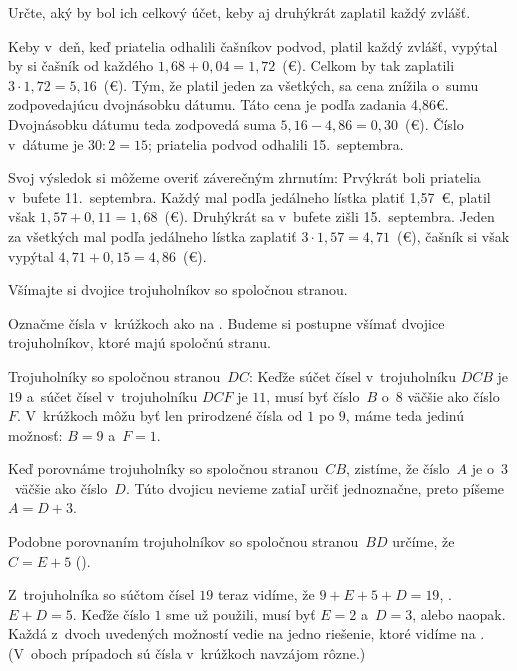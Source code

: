 {%
\napad
Určte, aký by bol ich celkový účet, keby aj druhýkrát zaplatil každý
zvlášť.

\riesenie
Keby v~deň, keď priatelia odhalili čašníkov podvod, platil každý zvlášť, vypýtal by si
čašník od každého $1{,}68+0{,}04=1{,}72$~(\euro).
Celkom by tak zaplatili $3\cdot 1{,}72=5{,}16$~(\euro).
Tým, že platil jeden za všetkých, sa cena znížila o~sumu zodpovedajúcu dvojnásobku dátumu.
Táto cena je podľa zadania 4{,}86€.
Dvojnásobku dátumu teda zodpovedá suma $5{,}16-4{,}86=0{,}30$~(\euro).
Číslo v~dátume je $30:2=15$;
priatelia podvod odhalili 15.~septembra.

\poznamka
Svoj výsledok si môžeme overiť záverečným zhrnutím:
Prvýkrát boli priatelia v~bufete 11.~septembra.
Každý mal podľa jedálneho lístka platiť 1{,}57~€, platil však $1{,}57+0{,}11=1{,}68$~(\euro).
Druhýkrát sa v~bufete zišli 15.~septembra.
Jeden za všetkých mal podľa jedálneho lístka zaplatiť $3\cdot 1{,}57=4{,}71$~(\euro),
čašník si však vypýtal $4{,}71+0{,}15=4{,}86$~(\euro).
}

{%
\napad
Všímajte si dvojice trojuholníkov so spoločnou stranou.


\riesenie
Označme čísla v~krúžkoch ako na \obr.
Budeme si postupne všímať dvojice trojuholníkov, ktoré majú spoločnú stranu.

Trojuholníky so spoločnou stranou~$DC$:
Keďže súčet čísel v~trojuholníku $DCB$ je $19$ a~súčet čísel
v~trojuholníku $DCF$ je $11$, musí byť číslo~$B$ o~$8$ väčšie ako číslo~$F$.
V~krúžkoch môžu byť len prirodzené čísla od $1$ po $9$, máme teda jedinú
možnosť: $B=9$ a~$F=1$.

Keď porovnáme trojuholníky so spoločnou stranou~$CB$, zistíme, že číslo~$A$
je o~$3$~väčšie ako číslo~$D$.
Túto dvojicu nevieme zatiaľ určiť jednoznačne, preto píšeme $A=D+3$.

Podobne porovnaním trojuholníkov so spoločnou stranou~$BD$ určíme, že $C=E+5$ (\obr).

Z~trojuholníka so súčtom čísel $19$ teraz vidíme, že $9+E+5+D=19$, \tj. $E+D=5$.
Keďže číslo $1$ sme už použili, musí byť $E=2$ a~$D=3$, alebo naopak.
Každá z~dvoch uvedených možností vedie na jedno riešenie, ktoré vidíme na \obr.
(V~oboch prípadoch sú čísla v~krúžkoch navzájom rôzne.)
}

